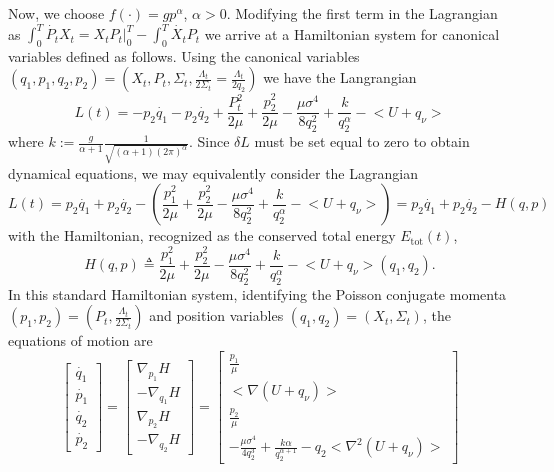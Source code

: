 \documentclass[letterpaper, 12pt]{article}
\begin{document}
Now, we choose $f(\cdot) = g p^\alpha$, $\alpha > 0$. Modifying the first term in the Lagrangian as $\int_{0}^{T} \dot{P_t} X_t = {X_t} P_t\bigg|_{0}^{T} - \int_{0}^{T} \dot{X_t} P_t$ we arrive at a Hamiltonian system for canonical variables defined as follows. Using the canonical variables $(q_1, p_1, q_2, p_2) = (X_t, P_t, \Sigma_t, \frac{\Lambda_t}{2 \Sigma_t} = \frac{\Lambda_t}{2q_2})$ we have the Langrangian
\begin{equation}
L(t) = - p_2 \dot{q_1} - p_2 \dot{q_2} + \frac{P_t^2}{2 \mu} + \frac{p_2^2}{2 \mu} - \frac{\mu\sigma^4}{8 q_2^2} + \frac{k}{q_2^\alpha} - \big< U + q_\nu \big>
\end{equation}
where $k := \frac{g}{\alpha + 1} \frac{1}{\sqrt{(\alpha+1) (2 \pi)^\alpha}}$. Since $\delta L$ must be set equal to zero to obtain dynamical equations, we may equivalently consider the Lagrangian
\begin{equation}
	L(t) = p_2 \dot{q_1} + p_2 \dot{q_2} - \left( \frac{p_1^2}{2 \mu} + \frac{p_2^2}{2 \mu} - \frac{\mu\sigma^4}{8 q_2^2} + \frac{k}{q_2^\alpha} - \big< U + q_\nu \big> \right) = p_2 \dot{q_1} + p_2 \dot{q_2} - H(q,p)
\end{equation}
with the Hamiltonian, recognized as the conserved total energy $E_\text{tot}(t)$,
\begin{equation}
H(q,p) \triangleq \frac{p_1^2}{2 \mu} + \frac{p_2^2}{2 \mu} - \frac{\mu\sigma^4}{8 q_2^2} + \frac{k}{q_2^\alpha} - \big< U + q_\nu \big>(q_1,q_2).
\end{equation}
In this standard  Hamiltonian system, identifying the Poisson conjugate momenta $(p_1,p_2) = (P_t,\frac{\Lambda_t}{2 \Sigma_t})$ and position variables $(q_1,q_2) = (X_t,\Sigma_t)$, the equations of motion are
\begin{equation}
\begin{bmatrix}
\dot{q_1} \\ \dot{p_1} \\ \dot{q_2} \\ \dot{p_2}
\end{bmatrix} = \begin{bmatrix}
\nabla_{p_1} H \\ -\nabla_{q_1} H \\ \nabla_{p_2} H \\ -\nabla_{q_2} H
\end{bmatrix} = 
\begin{bmatrix}
\frac{p_1}{\mu} \\  \big< \nabla (U + q_\nu) \big> \\ \frac{p_2}{\mu} \\ -\frac{\mu \sigma^4}{4 q_2^3} + \frac{k \alpha}{q_2^{\alpha + 1}} - q_2 \big< \nabla^2 (U + q_\nu) \big> 
\end{bmatrix}
\end{equation}
\end{document}
